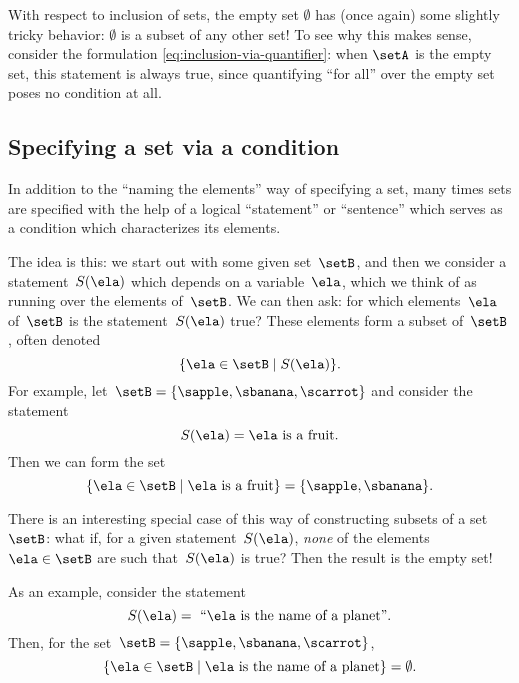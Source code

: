With respect to inclusion of sets, the empty set $\emptyset$ has (once again) some slightly tricky behavior: $\emptyset$ is a subset of any other set!
To see why this makes sense, consider the formulation \cref{eq:inclusion-via-quantifier}: when $\setA$ is the empty set, this statement is always true, since quantifying ``for all'' over the empty set poses no condition at all.


\subsection{Specifying a set via a condition}

In addition to the ``naming the elements'' way of specifying a set, many times sets are specified with the help of a logical ``statement'' or ``sentence'' which serves as a condition which characterizes its elements.

The idea is this: we start out with some given set~$\setB$, and then we consider a statement~$S(\ela)$ which depends on a variable~$\ela$, which we think of as running over the elements of~$\setB$.
We can then ask: for which elements~$\ela$ of~$\setB$ is the statement~$S(\ela)$ true?
These elements form a subset of~$\setB$, often denoted
%
\begin{equation}
    \label{eq:axiom-specialization}
    \{ \ela \in \setB \mid S(\ela) \}.
\end{equation}
%
For example, let~$\setB = \{ \sapple, \sbanana, \scarrot \}$ and consider the statement
%
\begin{equation*}
    S(\ela) =  \ela \text{ is a fruit}.
\end{equation*}
%
Then we can form the set
%
\begin{equation*}
    \{ \ela \in \setB \mid \ela \text{ is a fruit} \} = \{ \sapple, \sbanana \}.
\end{equation*}

There is an interesting special case of this way of constructing subsets of a set~$\setB$:
what if, for a given statement~$S(\ela)$, \emph{none} of the elements~$\ela \in \setB$ are such that~$S(\ela)$ is true?
Then the result is the empty set!

As an example, consider the statement
%
\begin{equation*}
    S(\ela) =\text{ ``} \ela \text{ is the name of a planet''}.
\end{equation*}
%
Then, for the set~$\setB = \{ \sapple, \sbanana, \scarrot \}$,
\begin{equation*}
    \{ \ela \in \setB \mid \ela \text{ is the name of a planet} \} = \emptyset.
\end{equation*}

